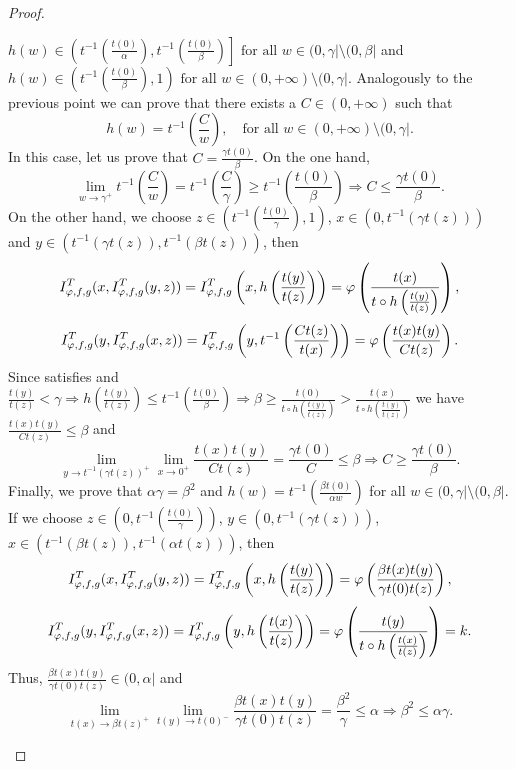 \begin{proof}
\begin{itemize}
		$h(w) \in \left (t^{-1} \left(\frac{t(0)}{\alpha}\right), t^{-1} \left(\frac{t(0)}{\beta}\right) \right] \text{ for all } w \in (0,\gamma| \setminus (0,\beta|$ and 
		$h(w) \in \left (t^{-1} \left(\frac{t(0)}{\beta}\right),1 \right) \text{ for all } w \in (0,+\infty) \setminus (0,\gamma|$. Analogously to the previous point we can prove that there exists a $C \in (0,+\infty)$ such that
		$$h(w) = t^{-1} \left(\frac{C}{w}\right), \quad \text{for all } w \in (0,+\infty) \setminus (0,\gamma|.$$
		In this case, let us prove that $C=\frac{\gamma t(0)}{\beta}$. On the one hand,
		$$ \lim_{w \to \gamma^+} t^{-1} \left(\frac{C}{w}\right) = t^{-1} \left(\frac{C}{\gamma}\right) \geq t^{-1} \left(\frac{t(0)}{\beta}\right) \Rightarrow C \leq \frac{\gamma t(0)}{\beta}.$$
		On the other hand, we choose $z \in \left(t^{-1} \left(\frac{t(0)}{\gamma}\right),1\right)$, $ x \in (0,t^{-1}(\gamma t(z)))$ and $y \in (t^{-1}(\gamma t(z)),t^{-1}(\beta t(z)))$, then
		$$I^T_{\varphi,f,g}(x,I^T_{\varphi,f,g}(y,z)) = I^T_{\varphi,f,g} \left(x, h \left(\frac{t(y)}{t(z)}\right)\right) = \varphi \left(\frac{t(x)}{t \circ h \left(\frac{t(y)}{t(z)}\right)}\right),$$
		$$I^T_{\varphi,f,g}(y,I^T_{\varphi,f,g}(x,z)) = I^T_{\varphi,f,g} \left(y, t^{-1} \left(\frac{Ct(z)}{t(x)}\right)\right) = \varphi \left(\frac{t(x)t(y)}{Ct(z)}\right).$$
		Since \IT satisfies \EP and $\frac{t(y)}{t(z)} < \gamma \Rightarrow h \left(\frac{t(y)}{t(z)}\right) \leq t^{-1} \left(\frac{t(0)}{\beta}\right) \Rightarrow \beta \geq \frac{t(0)}{t \circ h \left(\frac{t(y)}{t(z)}\right)} >\frac{t(x)}{t \circ h \left(\frac{t(y)}{t(z)}\right)}$ we have $\frac{t(x)t(y)}{Ct(z)} \leq \beta$ and
		$$\lim_{y \to t^{-1}(\gamma t(z))^+} \lim_{x \to 0^+} \frac{t(x)t(y)}{Ct(z)} =  \frac{\gamma t(0)}{C} \leq \beta \Rightarrow C \geq \frac{\gamma t(0)}{\beta}.$$
		Finally, we prove that $\alpha \gamma = \beta^2$ and $h(w)= t^{-1} \left(\frac{\beta t(0)}{\alpha w}\right)$ for all $w \in (0,\gamma| \setminus (0,\beta|$. If we choose $z \in \left(0,t^{-1} \left(\frac{t(0)}{\gamma}\right)\right)$, $y \in (0,t^{-1}(\gamma t(z)))$, $x \in (t^{-1}(\beta t(z)),t^{-1}(\alpha t(z)))$, then
		$$I^T_{\varphi,f,g}(x,I^T_{\varphi,f,g}(y,z)) = I^T_{\varphi,f,g} \left(x, h \left( \frac{t(y)}{t(z)}\right)\right) = \varphi \left( \frac{\beta t(x) t(y)}{\gamma t(0) t(z)}\right),$$
		$$I^T_{\varphi,f,g}(y, I^T_{\varphi,f,g}(x,z)) = I^T_{\varphi,f,g} \left(y,h\left(\frac{t(x)}{t(z)}\right)\right) = \varphi \left( \frac{t(y)}{t \circ h\left(\frac{t(x)}{t(z)}\right)}\right)=k.$$
		Thus,  $\frac{\beta t(x) t(y)}{\gamma t(0) t(z)} \in (0,\alpha|$ and
		$$\lim_{t(x) \to \beta t(z)^{+}} \lim_{ t(y) \to t(0)^{-}} \frac{\beta t(x) t(y)}{\gamma t(0) t(z)} = \frac{\beta^2}{\gamma} \leq \alpha \Rightarrow \beta^2 \leq \alpha \gamma.$$

\end{itemize}
\end{proof}
